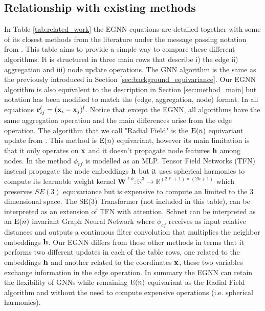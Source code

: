\subsection*{Relationship with existing methods}
 In Table \ref{tab:related_work} the EGNN equations are detailed together with some of its closest methods from the literature under the message passing notation from \cite{gilmer2017neural}. This table aims to provide a simple way to compare these different algorithms. It is structured in three main rows that describe i) the edge ii) aggregation and iii) node update operations. The GNN algorithm is the same as the previously introduced in Section \ref{sec:background_equivariance}. Our EGNN algorithm is also equivalent to the description in Section \ref{sec:method_main} but notation has been modified to match the (edge, aggregation, node) format. In all equations $\mathbf{r}_{ij}^l = (\mathbf{x}_i - \mathbf{x}_j)^l$. Notice that except the EGNN, all algorithms have the same aggregation operation and the main differences arise from the edge operation. The algorithm that we call "Radial Field" is the $\mathrm{E}(n)$ equivariant update from \cite{kohler2019equivariant_workshop}. This method is $\mathrm{E}(n)$ equivariant, however its main limitation is that it only operates on $\mathbf{x}$ and it doesn't propagate node features $\mathbf{h}$ among nodes. In the method $\phi_{rf}$ is modelled as an MLP. Tensor Field Networks (TFN) \cite{thomas2018tensor} instead propagate the node embeddings $\mathbf{h}$ but it uses spherical harmonics to compute its learnable weight kernel $ \mathbf{W}^{\ell k}: \mathbb{R}^{3} \rightarrow \mathbb{R}^{(2 \ell+1) \times(2 k+1)}$ which preserves $SE(3)$ equivariance but is expensive to compute an limited to the 3 dimensional space. The SE(3) Transformer \cite{fuchs2020se} (not included in this table), can be interpreted as an extension of TFN with attention. Schnet \cite{schutt2017schnet} can be interpreted as an $\mathrm{E}(n)$ invariant Graph Neural Network where $\phi_{cf}$ receives as input relative distances and outputs a continuous filter convolution that multiplies the neighbor embeddings $\mathbf{h}$. Our EGNN differs from these other methods in terms that it performs two different updates in each of the table rows, one related to the embeddings $\mathbf{h}$ and another related to the coordinates $\mathbf{x}$, these two variables exchange information in the edge operation. In summary the EGNN can retain the flexibility of GNNs while remaining $\mathrm{E}(n)$ equivariant as the Radial Field algorithm and without the need to compute expensive operations (i.e. spherical harmonics).